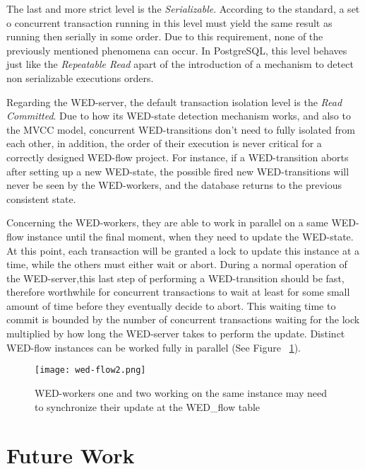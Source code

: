 \documentclass[12pt]{article}
\begin{document}
\par The last and more strict level is the \emph{Serializable}. According to the standard, a set o concurrent transaction
running in this level must yield the same result as running then serially in some order. Due to this requirement, none of 
the previously mentioned phenomena can occur. In PostgreSQL, this level behaves just like the \emph{Repeatable Read} apart
of the introduction of a mechanism to detect non serializable executions orders. 
 
\par Regarding the WED-server, the default transaction isolation level is the \emph{Read Committed}. Due to how its
WED-state detection mechanism works, and also to the MVCC model, concurrent WED-transitions don't need to fully isolated 
from each other, in addition, the order of their execution is never critical for a correctly designed WED-flow project. 
For instance, if a WED-transition aborts after setting up a new WED-state, the possible fired new WED-transitions
will never be seen by the WED-workers, and the database returns to the previous consistent state.  

\par Concerning the WED-workers, they are able to work in parallel on a same WED-flow instance until the final moment, when
they need to update the WED-state. At this point, each transaction will be granted a lock to update this instance at a time,
while the others must either wait or abort. During a normal operation of the WED-server,this last step of performing a WED-transition
should be fast, therefore worthwhile for concurrent transactions to wait at least for some small amount of time before they
eventually decide to abort. This waiting time to commit is bounded by the number of concurrent transactions waiting for 
the lock multiplied by how long the WED-server takes to perform the update. Distinct WED-flow instances can be worked fully
in parallel (See Figure ~\ref{fig_wf}).
   
\begin{figure}[!t]
\centering
\texttt{[image: wed-flow2.png]}
\caption{WED-workers one and two working on the same instance may need to synchronize their update at the WED\_flow table}
\label{fig_wf}
\end{figure}

\section{Future Work}
\end{document}
